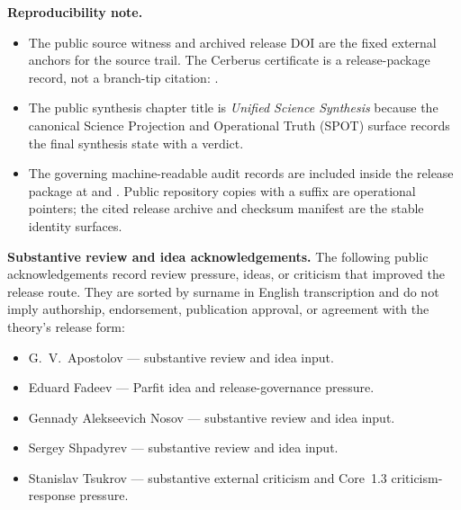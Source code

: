 \clearpage
\noindent\textbf{Reproducibility note.}
\begin{itemize}[leftmargin=1.6em,nosep]
\item The public source witness and archived release DOI are the fixed
      external anchors for the source trail. The Cerberus certificate is a
      release-package record, not a branch-tip citation:
      .
\item The public synthesis chapter title is \emph{Unified Science Synthesis}
      because the canonical Science Projection and Operational Truth (SPOT)
      surface records the final synthesis state with a  verdict.
\item The governing machine-readable audit records are included inside the
      release package at
      and
      .
      Public repository copies with a  suffix are operational
      pointers; the cited release archive and checksum manifest are the stable
      identity surfaces.
\end{itemize}



\noindent\textbf{Substantive review and idea acknowledgements.}
The following public acknowledgements record review pressure, ideas, or criticism
that improved the release route. They are sorted by surname in English
transcription and do not imply authorship, endorsement, publication approval, or
agreement with the theory's release form:
\begin{itemize}
    \item G.~V.~Apostolov --- substantive review and idea input.
    \item Eduard Fadeev --- Parfit idea and release-governance pressure.
    \item Gennady Alekseevich Nosov --- substantive review and idea input.
    \item Sergey Shpadyrev --- substantive review and idea input.
    \item Stanislav Tsukrov --- substantive external criticism and Core~1.3 criticism-response pressure.
\end{itemize}

\clearpage
